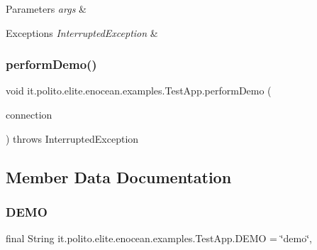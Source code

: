 \begin{DoxyParams}{Parameters}
{\em args} & \\
\hline
\end{DoxyParams}

\begin{DoxyExceptions}{Exceptions}
{\em Interrupted\+Exception} & \\
\hline
\end{DoxyExceptions}
\hypertarget{classit_1_1polito_1_1elite_1_1enocean_1_1examples_1_1_test_app_a3f7d2899536e795b0fa17a12e3aa71de}{}\label{classit_1_1polito_1_1elite_1_1enocean_1_1examples_1_1_test_app_a3f7d2899536e795b0fa17a12e3aa71de} 
\subsubsection{\texorpdfstring{perform\+Demo()}{performDemo()}}
{\footnotesize\ttfamily void it.\+polito.\+elite.\+enocean.\+examples.\+Test\+App.\+perform\+Demo (\begin{DoxyParamCaption}\item[{\hyperlink{classit_1_1polito_1_1elite_1_1enocean_1_1enj_1_1communication_1_1_en_j_connection}{En\+J\+Connection}}]{connection }\end{DoxyParamCaption}) throws Interrupted\+Exception}



\subsection{Member Data Documentation}
\hypertarget{classit_1_1polito_1_1elite_1_1enocean_1_1examples_1_1_test_app_a1315ab9f70d935035ff5d345da90b155}{}\label{classit_1_1polito_1_1elite_1_1enocean_1_1examples_1_1_test_app_a1315ab9f70d935035ff5d345da90b155} 
\subsubsection{\texorpdfstring{D\+E\+MO}{DEMO}}
{\footnotesize\ttfamily final String it.\+polito.\+elite.\+enocean.\+examples.\+Test\+App.\+D\+E\+MO = \char`\"{}demo\char`\"{}\hspace{0.3cm}{\ttfamily [static]}, {\ttfamily [protected]}}

